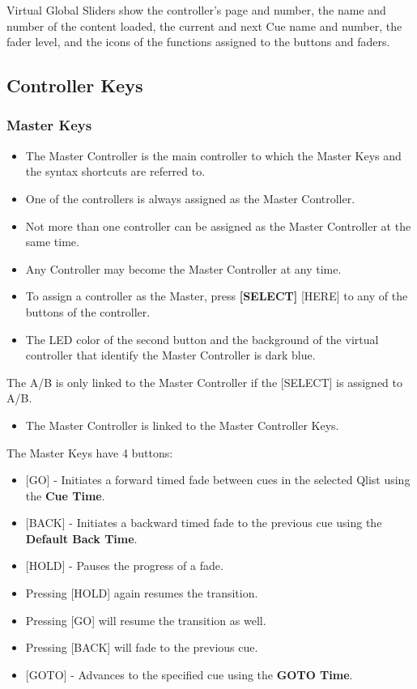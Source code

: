 \documentclass[
]{article}
\providecommand{\tightlist}{%
  \setlength{\itemsep}{0pt}\setlength{\parskip}{0pt}}
\begin{document}
Virtual Global Sliders show the controller's page and number, the name and number of the content loaded, the current and next Cue name and number, the fader level, and the icons of the functions assigned to the buttons and faders.

\hypertarget{Controller-Keys-11.3}{%
\subsection{Controller Keys}\label{Controller-Keys-11.3}}

\hypertarget{master-keys}{%
\subsubsection{Master Keys}\label{master-keys}}

\begin{itemize}
\item
  The Master Controller is the main controller to which the Master Keys and the syntax shortcuts are referred to.
\item
  One of the controllers is always assigned as the Master Controller.
\item
  Not more than one controller can be assigned as the Master Controller at the same time.
\item
  Any Controller may become the Master Controller at any time.
\item
  To assign a controller as the Master, press \textbf{{[}SELECT{]}} {[}HERE{]} to any of the buttons of the controller.
\item
  The LED color of the second button and the background of the virtual controller that identify the Master Controller is {dark blue}.
\end{itemize}

{The A/B is only linked to the Master Controller if the {[}SELECT{]} is assigned to A/B.}

\begin{itemize}
\tightlist
\item
  The Master Controller is linked to the Master Controller Keys.
\end{itemize}

The Master Keys have 4 buttons:

\begin{itemize}
\item
  {[}GO{]} - Initiates a forward timed fade between cues in the selected Qlist using the \textbf{Cue Time}.
\item
  {[}BACK{]} - Initiates a backward timed fade to the previous cue using the \textbf{Default Back Time}.
\item
  {[}HOLD{]} - Pauses the progress of a fade.
\item
  Pressing {[}HOLD{]} again resumes the transition.
\item
  Pressing {[}GO{]} will resume the transition as well.
\item
  Pressing {[}BACK{]} will fade to the previous cue.
\item
  {[}GOTO{]} - Advances to the specified cue using the \textbf{GOTO Time}.
\end{itemize}
\end{document}
